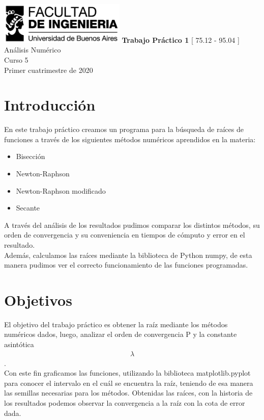 \documentclass[titlepage,a4paper]{article}
\begin{document}
\begin{titlepage} %
	\hfill\includegraphics[width=6cm]{logofiuba.jpg}
    \centering
    \vfill
    \Huge \textbf{Trabajo Práctico 1}
    \vskip2cm
    \Large [ 75.12 - 95.04 ] Análisis Numérico\\
    Curso 5 \\ 
    Primer cuatrimestre de 2020 
    \vfill
    \vfill
    \vfill
\end{titlepage}

\tableofcontents %

\section{Introducción}\label{sec:intro}
En este trabajo práctico creamos un programa para la búsqueda de raíces de funciones a través de los siguientes métodos numéricos aprendidos en la materia:
\begin{itemize}
\item Bisección
\item Newton-Raphson
\item Newton-Raphson modificado
\item Secante
\end{itemize}
A través del análisis de los resultados pudimos comparar los distintos métodos, su orden de convergencia y su conveniencia en tiempos de cómputo y error en el resultado.
\\Además, calculamos las raíces mediante la biblioteca de Python numpy, de esta manera pudimos ver el correcto funcionamiento de las funciones programadas.

\section{Objetivos}\label{sec:objetivos}
El objetivo del trabajo práctico es obtener la raíz mediante los métodos numéricos dados, luego, analizar el orden de convergencia P y la constante asintótica \begin{align}
\lambda
\end{align}. 
\\Con este fin graficamos las funciones, utilizando la biblioteca matplotlib.pyplot para conocer el intervalo en el cuál se encuentra la raíz, teniendo de esa manera las semillas necesarias para los métodos. Obtenidas las raíces, con la historia de los resultados podemos observar la convergencia a la raíz con la cota de error dada.
\end{document}
